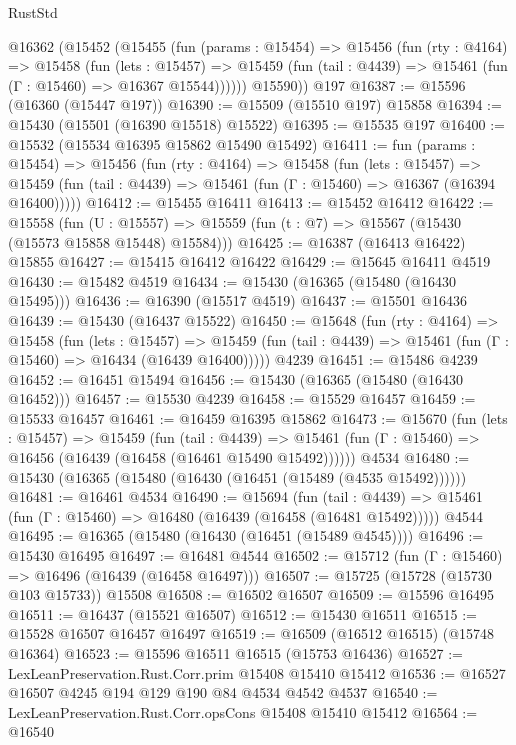 \begin{lexlean}{RustStd}
\begin{coremodule}
{\begin{coremodule}
{{{{{{{{{{{{{{{{{{{{{{{{{{{{{{{{{{{{{{{{{{{{{{{{{{{{{{{{{{{{    @16362
      (@15452
        (@15455
          (fun (params : @15454) =>
          @15456
            (fun (rty : @4164) =>
            @15458
              (fun (lets : @15457) =>
              @15459 (fun (tail : @4439) => @15461 (fun (Γ : @15460) => @16367 @15544))))))
        @15590))
    @197
@16387 := @15596 (@16360 (@15447 @197))
@16390 := @15509 (@15510 @197) @15858
@16394 := @15430 (@15501 (@16390 @15518) @15522)
@16395 := @15535 @197
@16400 := @15532 (@15534 @16395 @15862 @15490 @15492)
@16411 := fun (params : @15454) =>
  @15456
    (fun (rty : @4164) =>
    @15458
      (fun (lets : @15457) =>
      @15459 (fun (tail : @4439) => @15461 (fun (Γ : @15460) => @16367 (@16394 @16400)))))
@16412 := @15455 @16411
@16413 := @15452 @16412
@16422 := @15558
    (fun (U : @15557) => @15559 (fun (t : @7) => @15567 (@15430 (@15573 @15858 @15448) @15584)))
@16425 := @16387 (@16413 @16422) @15855
@16427 := @15415 @16412 @16422
@16429 := @15645 @16411 @4519
@16430 := @15482 @4519
@16434 := @15430 (@16365 (@15480 (@16430 @15495)))
@16436 := @16390 (@15517 @4519)
@16437 := @15501 @16436
@16439 := @15430 (@16437 @15522)
@16450 := @15648
    (fun (rty : @4164) =>
    @15458
      (fun (lets : @15457) =>
      @15459 (fun (tail : @4439) => @15461 (fun (Γ : @15460) => @16434 (@16439 @16400)))))
    @4239
@16451 := @15486 @4239
@16452 := @16451 @15494
@16456 := @15430 (@16365 (@15480 (@16430 @16452)))
@16457 := @15530 @4239
@16458 := @15529 @16457
@16459 := @15533 @16457
@16461 := @16459 @16395 @15862
@16473 := @15670
    (fun (lets : @15457) =>
    @15459
      (fun (tail : @4439) =>
      @15461 (fun (Γ : @15460) => @16456 (@16439 (@16458 (@16461 @15490 @15492))))))
    @4534
@16480 := @15430 (@16365 (@15480 (@16430 (@16451 (@15489 (@4535 @15492))))))
@16481 := @16461 @4534
@16490 := @15694
    (fun (tail : @4439) => @15461 (fun (Γ : @15460) => @16480 (@16439 (@16458 (@16481 @15492)))))
    @4544
@16495 := @16365 (@15480 (@16430 (@16451 (@15489 @4545))))
@16496 := @15430 @16495
@16497 := @16481 @4544
@16502 := @15712 (fun (Γ : @15460) => @16496 (@16439 (@16458 @16497)))
@16507 := @15725 (@15728 (@15730 @103 @15733)) @15508
@16508 := @16502 @16507
@16509 := @15596 @16495
@16511 := @16437 (@15521 @16507)
@16512 := @15430 @16511
@16515 := @15528 @16507 @16457 @16497
@16519 := @16509 (@16512 @16515) (@15748 @16364)
@16523 := @15596 @16511 @16515 (@15753 @16436)
@16527 := LexLeanPreservation.Rust.Corr.prim @15408 @15410 @15412
@16536 := @16527 @16507 @4245 @194 @129 @190 @84 @4534 @4542 @4537
@16540 := LexLeanPreservation.Rust.Corr.opsCons @15408 @15410 @15412
@16564 := @16540
}}}}}}}}}}}}}}}}}}}}}}}}}}}}}}}}}}}}}}}}}}}}}}}}}}}}}}}}}}}}
\end{coremodule}}
\end{coremodule}
\end{lexlean}
